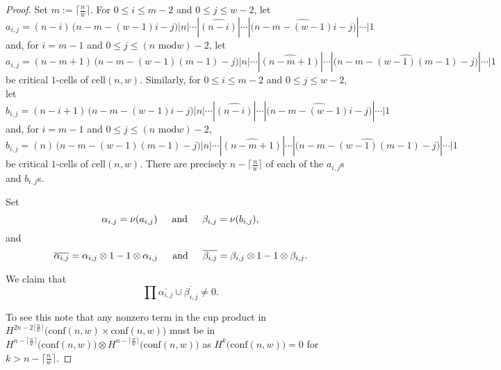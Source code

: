 \begin{proof}
Set $m:=\big\lceil\frac{n}{w}\big\rceil$.
For $0\le i\le m-2$ and $0\le j\le w-2$, let
\[
a_{i, j}=(n-i)\, \big(n-m-(w-1)i-j\big)|n|\cdots|\widehat{(n-i)}|\cdots|\widehat{\big(n-m-(w-1)i-j\big)}|\cdots|1
\]
and, for $i=m-1$ and $0\le j\le (n\text{ mod}w)-2$, let
\[
a_{i,j}=(n-m+1)\, \big(n-m-(w-1)(m-1)-j\big)|n|\cdots|\widehat{(n-m+1)}|\cdots|\widehat{\big(n-m-(w-1)(m-1)-j\big)}|\cdots|1
\]
be critical $1$-cells of $\text{cell}(n,w)$.
Similarly, for $0\le i\le m-2$ and $0\le j\le w-2$, let
\[
b_{i, j}=(n-i+1)\, \big(n-m-(w-1)i-j\big)|n|\cdots|\widehat{(n-i)}|\cdots|\widehat{\big(n-m-(w-1)i-j\big)}|\cdots|1
\]
and, for $i=m-1$ and $0\le j\le (n\text{ mod}w)-2$,
\[
b_{i,j}=(n)\, \big(n-m-(w-1)(m-1)-j\big)|n|\cdots|\widehat{(n-m+1)}|\cdots|\widehat{\big(n-m-(w-1)(m-1)-j\big)}|\cdots|1
\]
be critical $1$-cells of $\text{cell}(n,w)$.
There are precisely $n-\big\lceil\frac{n}{w}\big\rceil$ of each of the $a_{i, j}$s and $b_{i,j}$s.

Set
\[
\alpha_{i,j}=\nu(a_{i,j})\indent\text{and}\indent\beta_{i,j}=\nu(b_{i,j}),
\]
and
\[
\overline{\alpha_{i,j}}=\alpha_{i,j}\otimes 1-1\otimes \alpha_{i,j}\indent\text{and}\indent
\overline{\beta_{i,j}}=\beta_{i,j}\otimes 1-1\otimes \beta_{i,j}.
\]

We claim that 
\[
\prod\overline{\alpha_{i,j}}\cup\overline{\beta_{i,j}}\neq0.
\]

To see this note that any nonzero term in the cup product in $H^{2n-2\big\lceil\frac{n}{w}\big\rceil}\big(\text{conf}(n,w)\times \text{conf}(n,w)\big)$ must be in $H^{n-\lceil\frac{n}{w}\rceil}\big(\text{conf}(n,w)\big)\otimes H^{n-\lceil\frac{n}{w}\rceil}\big(\text{conf}(n,w)\big)$ as $H^{k}\big(\text{conf}(n,w)\big)=0$ for $k>n-\big\lceil\frac{n}{w}\big\rceil$.


\end{proof}
